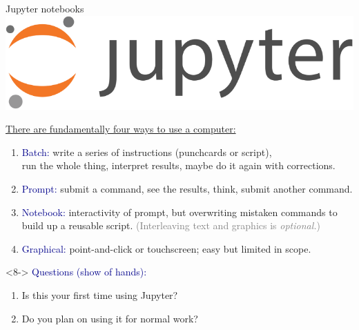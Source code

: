 \documentclass[aspectratio=169]{beamer}
\begin{document}
\begin{frame}{Jupyter notebooks}
\vspace{0.4 cm}
\hfill \includegraphics[height=0.8 cm]{jupyter-logo.png}

\vspace{-0.8 cm}
\underline{There are fundamentally four ways to use a computer:}

\vspace{0.15 cm}
\begin{enumerate}
\item<2-> \textcolor{darkblue}{Batch:} write a series of instructions (punchcards or script), \\ run the whole thing, interpret results, maybe do it again with corrections.
\item<3-> \textcolor{darkblue}{Prompt:} submit a command, see the results, think, submit another command.
\item<4-> \textcolor{darkblue}{Notebook:} interactivity of prompt, but overwriting mistaken commands to build up a reusable script. \textcolor{gray}{(Interleaving text and graphics is {\it optional.})}
\item<5-> \textcolor{darkblue}{Graphical:} point-and-click or touchscreen; easy but limited in scope.
\end{enumerate}

\vspace{0.25 cm}

\vspace{0.25 cm}

\vspace{0.35 cm}
\begin{uncoverenv}<8->
\small
\textcolor{darkblue}{Questions (show of hands):}
\vspace{-0.2 cm}
\begin{enumerate}\setlength{\itemsep}{-0.1 cm}
\item Is this your first time using Jupyter?
\item Do you plan on using it for normal work?
\end{enumerate}
\end{uncoverenv}
\end{frame}
\end{document}

